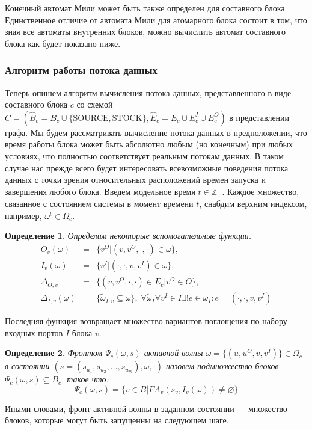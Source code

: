 \documentclass[10pt,a4paper]{article}
\newtheorem{defen}{Определение}
\newcommand{\stock}{\text{STOCK}}
\newcommand{\source}{\text{SOURCE}}
\newcommand{\FA}{F\!A}
\begin{document}
Конечный автомат Мили может быть также определен для составного блока. Единственное отличие от автомата Мили для атомарного блока состоит в том, что
зная все автоматы внутренних блоков, можно вычислить автомат составного блока как будет показано ниже.

\subsubsection{Алгоритм работы потока данных}
Теперь опишем алгоритм вычисления потока данных, представленного в виде составного блока $c$ со схемой
$C = (\hat{B}_c = B_c \cup \{\source, \stock\}, \hat{E}_c= E_c \cup E^I_c \cup E^O_c)$ в представлении графа.
Мы будем рассматривать вычисление потока данных в предположении,
что время работы блока может быть абсолютно любым (но конечным) при любых условиях, что полностью соответствует реальным потокам данных.
В таком случае нас прежде всего будет интересовать всевозможные поведения потока данных с точки зрения относительных расположений времен запуска и завершения любого блока.
Введем модельное время $t \in \mathbb{Z}_+$.
Каждое множество, связанное с состоянием системы в момент времени $t$, снабдим верхним индексом, например, $\omega^t \in \Omega_c$.

\begin{defen}
  Определим некоторые вспомогательные функции.
  \begin{eqnarray*}
    O_v(\omega) & = & \{v^O \vert (v, v^O, \cdot, \cdot) \in \omega\}, \\
    I_v(\omega) & = & \{v^I \vert (\cdot, \cdot, v, v^I) \in \omega\}, \\
    \Delta_{O, v} & = & \{(v, v^O, \cdot, \cdot) \in E_c \vert v^O \in O\}, \\
    \Delta_{I, v} (\omega) & = & \{\tilde \omega_{I, v} \subseteq \omega \}, \; \forall \tilde \omega_I \forall v^I \in I \exists ! e \in \omega_I: e = (\cdot, \cdot, v, v^I)
  \end{eqnarray*}
\end{defen}
Последняя функция возвращает множество вариантов поглощения по набору входных портов $I$ блока $v$.

\begin{defen}
  Фронтом $\Psi_c (\omega, s)$ активной волны $\omega = \{(u, u^O, v, v^I)\} \in \Omega_c$ в состоянии $(s = (s_{u_1}, s_{u_2}, \dots, s_{u_m}), \omega, \cdot)$
  назовем подмножество блоков $\Psi_c (\omega, s) \subseteq B_c$, такое что:
  $$\Psi_c (\omega, s) = \{ v \in B \vert \FA_v(s_v, I_v(\omega)) \neq \varnothing\}$$
\end{defen}
Иными словами, фронт активной волны в заданном состоянии --- множество блоков, которые могут быть запущенны на следующем шаге.
\end{document}
